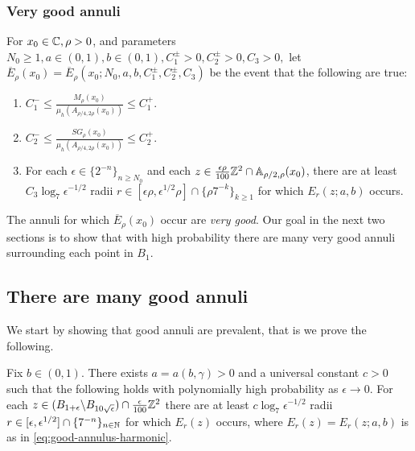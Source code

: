 \documentclass[12pt]{amsart}
\numberwithin{equation}{section}
\newcommand{\Mrho}[2]{\hyperref[eq:alternate-size]{M_{#1}(#2)}}
\newcommand{\SGrho}[2]{\hyperref[eq:alternate-size-2]{SG_{#1}(#2)}}
\begin{document}
	\subsubsection{Very good annuli}
	For $x_0 \in \mathbb{C}, \rho > 0$, and parameters $N_0 \geq 1,  a \in (0,1),b \in(0,1), C^{\pm}_1 > 0, C^{\pm}_2 > 0, C_3 > 0, $ let $\overline E_\rho(x_0) = \overline E_\rho(x_0; N_0, a, b,C^{\pm}_1, C^{\pm}_2, C_3)$ be the event that the following are true:
	\begin{enumerate}[label=(VG-\roman*)]
		\item $C^-_1  \leq \frac{\Mrho{\rho}{x_0}}{\mu_h(A_{\rho/4, 2 \rho}(x_0))} \leq C^+_1$.  \label{enum:very-good-criteria-1}
		\item $C^-_2  \leq \frac{\SGrho{\rho}{x_0}}{\mu_h(A_{\rho/4, 2 \rho}(x_0))} \leq C^+_2$.   \label{enum:very-good-criteria-2}
		\item For each $\epsilon \in \{2^{-n}\}_{n \geq N_0}$
		and each $z \in \frac{\epsilon \rho}{100} \mathbb{Z}^2 \cap \mathbb{A}_{\rho/2, \rho}(x_0)$,
		there are at least $C_3 \log_7 \epsilon^{-1/2}$ radii $r \in [\epsilon \rho, \epsilon^{1/2} \rho] \cap \{\rho 7^{-k}\}_{k \geq 1}$
		for which $E_r(z; a, b)$ occurs.   \label{enum:very-good-criteria-3}
	\end{enumerate}
	The annuli for which $\overline E_{\rho}(x_0)$ occur are {\it very good}. 
	Our goal in the next two sections is to show that with high probability there are many very good annuli surrounding each point in $B_1$.
	
	
	
	
	
	
	\subsection{There are many good annuli} \label{subsec:good-annuli-are-prevalent}
	
	
	We start by showing that good annuli are prevalent, that is we prove the following. 
	
	
	
	\begin{lemma} \label{lemma:good-annuli}
		Fix $b \in (0,1)$. There exists $a = a(b,\gamma) > 0$ and a universal constant $c > 0$ such that the following holds
		with polynomially high probability as $\epsilon \to 0$. 
		For each $z \in (B_{1 + \epsilon} \backslash B_{10 \sqrt{\epsilon}}) \cap \frac{\epsilon}{100} \mathbb{Z}^2$ there are at least $c \log_7 \epsilon^{-1/2}$ radii $r \in [\epsilon, \epsilon^{1/2}] \cap
		\{7^{-n}\}_{n \in \mathbb{N}}$ for which $E_r(z)$ occurs, where $E_r(z) = E_r(z; a, b)$ is as in \eqref{eq:good-annulus-harmonic}. 
	\end{lemma}
	
\end{document}
